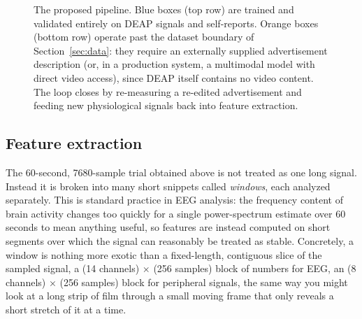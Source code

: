 \documentclass[conference]{IEEEtran}
\begin{document}
\begin{figure}[!t]
\caption{The proposed pipeline. Blue boxes (top row) are trained and
validated entirely on DEAP signals and self-reports. Orange boxes (bottom
row) operate past the dataset boundary of Section~\ref{sec:data}: they
require an externally supplied advertisement description (or, in a
production system, a multimodal model with direct video access), since
DEAP itself contains no video content. The loop closes by re-measuring a
re-edited advertisement and feeding new physiological signals back into
feature extraction.}
\label{fig:pipeline}
\end{figure}

\subsection{Feature extraction}
\label{subsec:features}

The 60-second, 7680-sample trial obtained above is not treated as one
long signal. Instead it is broken into many short snippets called
\emph{windows}, each analyzed separately. This is standard practice in
EEG analysis: the frequency content of brain activity changes too quickly
for a single power-spectrum estimate over 60 seconds to mean anything
useful, so features are instead computed on short segments over which the
signal can reasonably be treated as stable. Concretely, a window is
nothing more exotic than a fixed-length, contiguous slice of the sampled
signal, a (14 channels) $\times$ (256 samples) block of numbers for EEG,
an (8 channels) $\times$ (256 samples) block for peripheral signals, the
same way you might look at a long strip of film through a small moving
frame that only reveals a short stretch of it at a time.
\end{document}
